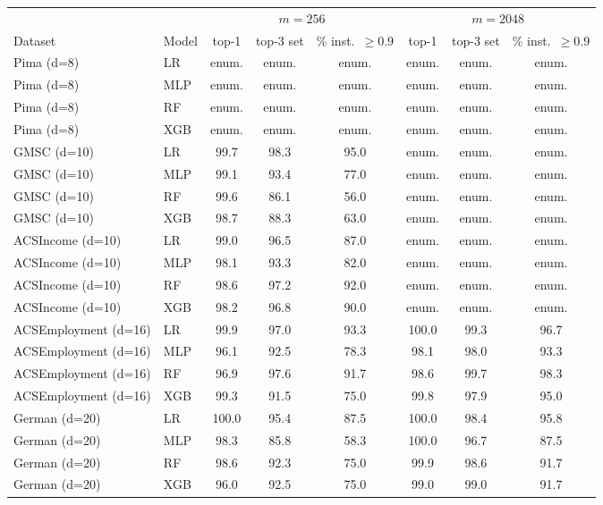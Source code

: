 \begin{tabular}{llcccccc}
\toprule
 & & \multicolumn{3}{c}{$m=256$} & \multicolumn{3}{c}{$m=2048$}\\
\cmidrule(lr){3-5}\cmidrule(lr){6-8}
Dataset & Model & top-1 & top-3 set & \% inst.\ $\ge$0.9 & top-1 & top-3 set & \% inst.\ $\ge$0.9\\
\midrule
Pima (d=8) & LR & enum. & enum. & enum. & enum. & enum. & enum.\\
Pima (d=8) & MLP & enum. & enum. & enum. & enum. & enum. & enum.\\
Pima (d=8) & RF & enum. & enum. & enum. & enum. & enum. & enum.\\
Pima (d=8) & XGB & enum. & enum. & enum. & enum. & enum. & enum.\\
GMSC (d=10) & LR & 99.7 & 98.3 & 95.0 & enum. & enum. & enum.\\
GMSC (d=10) & MLP & 99.1 & 93.4 & 77.0 & enum. & enum. & enum.\\
GMSC (d=10) & RF & 99.6 & 86.1 & 56.0 & enum. & enum. & enum.\\
GMSC (d=10) & XGB & 98.7 & 88.3 & 63.0 & enum. & enum. & enum.\\
ACSIncome (d=10) & LR & 99.0 & 96.5 & 87.0 & enum. & enum. & enum.\\
ACSIncome (d=10) & MLP & 98.1 & 93.3 & 82.0 & enum. & enum. & enum.\\
ACSIncome (d=10) & RF & 98.6 & 97.2 & 92.0 & enum. & enum. & enum.\\
ACSIncome (d=10) & XGB & 98.2 & 96.8 & 90.0 & enum. & enum. & enum.\\
ACSEmployment (d=16) & LR & 99.9 & 97.0 & 93.3 & 100.0 & 99.3 & 96.7\\
ACSEmployment (d=16) & MLP & 96.1 & 92.5 & 78.3 & 98.1 & 98.0 & 93.3\\
ACSEmployment (d=16) & RF & 96.9 & 97.6 & 91.7 & 98.6 & 99.7 & 98.3\\
ACSEmployment (d=16) & XGB & 99.3 & 91.5 & 75.0 & 99.8 & 97.9 & 95.0\\
German (d=20) & LR & 100.0 & 95.4 & 87.5 & 100.0 & 98.4 & 95.8\\
German (d=20) & MLP & 98.3 & 85.8 & 58.3 & 100.0 & 96.7 & 87.5\\
German (d=20) & RF & 98.6 & 92.3 & 75.0 & 99.9 & 98.6 & 91.7\\
German (d=20) & XGB & 96.0 & 92.5 & 75.0 & 99.0 & 99.0 & 91.7\\
\bottomrule
\end{tabular}